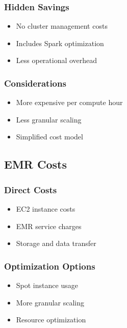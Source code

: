 \documentclass[
  letterpaper,
  DIV=11,
  numbers=noendperiod]{scrartcl}
\providecommand{\tightlist}{%
  \setlength{\itemsep}{0pt}\setlength{\parskip}{0pt}}\usepackage{longtable,booktabs,array}
\begin{document}
\subsubsection{Hidden Savings}

\begin{itemize}
\tightlist
\item
  No cluster management costs
\item
  Includes Spark optimization
\item
  Less operational overhead
\end{itemize}

\subsubsection{Considerations}

\begin{itemize}
\tightlist
\item
  More expensive per compute hour
\item
  Less granular scaling
\item
  Simplified cost model
\end{itemize}

\subsection{EMR Costs}\label{emr-costs}

\subsubsection{Direct Costs}

\begin{itemize}
\tightlist
\item
  EC2 instance costs
\item
  EMR service charges
\item
  Storage and data transfer
\end{itemize}

\subsubsection{Optimization Options}

\begin{itemize}
\tightlist
\item
  Spot instance usage
\item
  More granular scaling
\item
  Resource optimization
\end{itemize}
\end{document}

